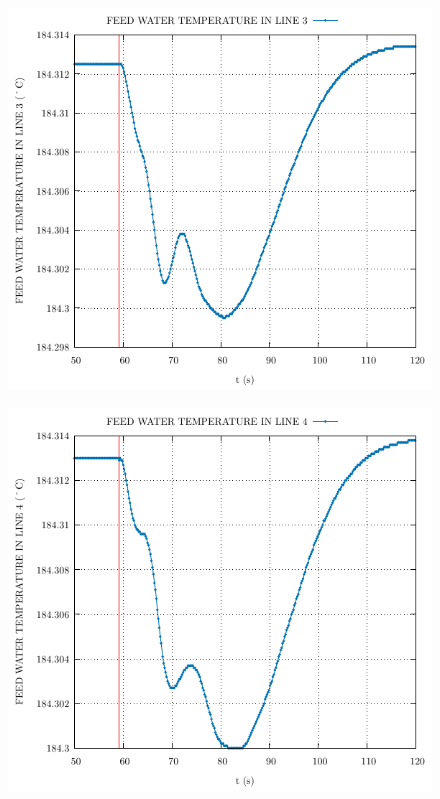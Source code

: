 \documentclass{article}
\begin{document}
\begin{multicols}{2}
\begin{figure}[H]
\end{figure}
\begin{figure}[H]
\centering
\includegraphics[width=\linewidth]{./graphs/FEED WATER TEMPERATURE IN LINE 3_comp.pdf}
\end{figure}
\begin{figure}[H]
\centering
\includegraphics[width=\linewidth]{./graphs/FEED WATER TEMPERATURE IN LINE 4_comp.pdf}

\end{figure}
\end{multicols}
\end{document}
